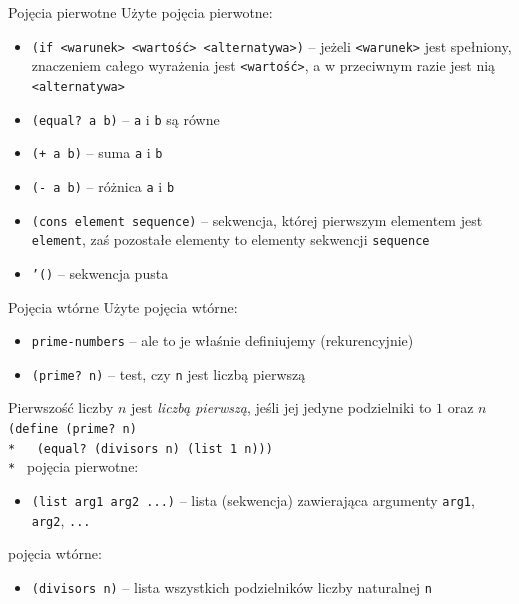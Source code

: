 \documentclass{beamer}
\begin{document}
\begin{frame}{Pojęcia pierwotne}
  Użyte pojęcia pierwotne: \pause
  \begin{itemize}
  \item \texttt{(if <warunek> <wartość> <alternatywa>)} -- jeżeli
    \texttt{<warunek>} jest spełniony, znaczeniem całego wyrażenia jest
    \texttt{<wartość>}, a w przeciwnym razie jest nią \texttt{<alternatywa>}\pause
  \item \texttt{(equal? a b)} -- \texttt{a} i \texttt{b} są równe\pause
  \item \texttt{(+ a b)} -- suma \texttt{a} i \texttt{b}\pause
  \item \texttt{(- a b)} -- różnica \texttt{a} i \texttt{b}\pause
  \item \texttt{(cons element sequence)} -- sekwencja, której pierwszym
    elementem jest \texttt{element}, zaś pozostałe elementy to elementy
    sekwencji \texttt{sequence}\pause
  \item \texttt{'()} -- sekwencja pusta
  \end{itemize}
\end{frame}

\begin{frame}{Pojęcia wtórne}
  Użyte pojęcia wtórne:\pause
  \begin{itemize}
  \item \texttt{prime-numbers} -- ale to je właśnie definiujemy
    (rekurencyjnie) \pause
  \item \texttt{(prime?\ n)} -- test, czy \texttt{n} jest liczbą pierwszą
  \end{itemize}
\end{frame}

\begin{frame}{Pierwszość liczby}
  $n$ jest \textit{liczbą pierwszą}, jeśli jej jedyne podzielniki
  to $1$ oraz $n$\pause
  \texttt{
(define (prime?\ n)\\*
\ \ (equal? (divisors n) (list 1 n)))\\*
    }\pause
  pojęcia pierwotne:\pause
  \begin{itemize}
  \item \texttt{(list arg1 arg2 ...)} -- lista (sekwencja) zawierająca argumenty
    \texttt{arg1}, \texttt{arg2}, \texttt{...}\pause
  \end{itemize}
  pojęcia wtórne:\pause
  \begin{itemize}
  \item \texttt{(divisors n)} -- lista wszystkich podzielników liczby naturalnej
    \texttt{n}
  \end{itemize}
  
\end{frame}
\end{document}
